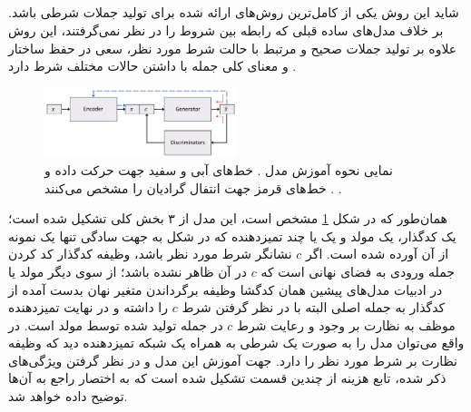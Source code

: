 \subsection{}
شاید این روش یکی از کامل‌ترین روش‌های ارائه شده برای تولید جملات شرطی باشد. بر خلاف مدل‌های ساده قبلی که رابطه بین شروط را در نظر نمی‌گرفتند، این روش علاوه بر تولید جملات صحیح و مرتبط با حالت شرط مورد نظر، سعی در حفظ ساختار و معنای کلی جمله با داشتن حالات مختلف شرط دارد \cite{toward}.
\begin{figure}[h]
	\centering
	\includegraphics[width=0.5\textwidth]{images/toward1.png}
	\caption{
		نمایی نحوه آموزش مدل \towardctg. خط‌های آبی و سفید جهت حرکت داده و خط‌های قرمز جهت انتفال گرادیان را مشخص می‌کنند \cite{toward}.
		\cite{toward}.}
	\label{fig:toward}
\end{figure}
همان‌طور که در شکل \ref{fig:toward} مشخص است، این مدل از ۳ بخش کلی تشکیل شده است؛ یک کدگذار، یک مولد و یک یا چند تمیزدهنده که در شکل به جهت سادگی تنها یک نمونه از آن آورده شده است. اگر $c$ نشانگر شرط مورد نظر باشد، وظیفه کدگذار کد کردن جمله ورودی به فضای نهانی است که $c$ در آن ظاهر نشده باشد؛ از سوی دیگر مولد یا در ادبیات مدل‌های پیشین همان کدگشا وظیفه برگرداندن متغیر نهان بدست آمده از کدگذار به جمله اصلی البته با در نظر گرفتن شرط $c$ را داشته و در نهایت تمیزدهنده موظف به نظارت بر وجود و رعایت شرط $c$ در جمله تولید شده توسط مولد است. در واقع می‌توان مدل را به صورت یک \vae{} شرطی به همراه یک شبکه تمیزدهنده دید که وظیفه نظارت بر شرط مورد نظر را دارد. جهت آموزش این مدل و در نظر گرفتن ویژگی‌های ذکر شده، تابع هزینه از چندین قسمت تشکیل شده است که به اختصار راجع به آن‌ها توضیح داده خواهد شد.\\

